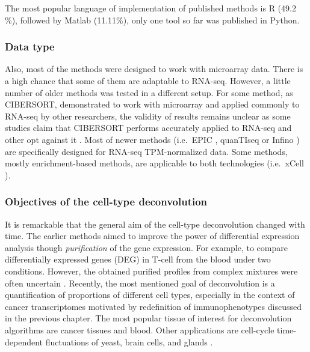\documentclass[12pt,]{book}
\theoremstyle{definition}
\theoremstyle{definition}
\theoremstyle{definition}
\theoremstyle{remark}
\begin{document}
The most popular language of implementation of published methods is R
(49.2 \%), followed by Matlab (11.11\%), only one tool so far was
published in Python.

\hypertarget{data-type}{%
\subsubsection{Data type}\label{data-type}}

Also, most of the methods were designed to work with microarray data.
There is a high chance that some of them are adaptable to RNA-seq.
However, a little number of older methods was tested in a different
setup. For some method, as CIBERSORT, demonstrated to work with
microarray and applied commonly to RNA-seq by other researchers, the
validity of results remains unclear as some studies claim that CIBERSORT
performs accurately applied to RNA-seq \citep{Thorsson2018} and other
opt against it \citep{Li2017, Tamborero2018}. Most of newer methods
(i.e.~EPIC \citep{Racle2017}, quanTIseq \citep{Finotello2017} or Infino
\citep{Zaslavsky2017}) are specifically designed for RNA-seq
TPM-normalized data. Some methods, mostly enrichment-based methods, are
applicable to both technologies (i.e.~xCell \citep{Aran2017}).

\hypertarget{objectives-of-the-cell-type-deconvolution}{%
\subsubsection{Objectives of the cell-type
deconvolution}\label{objectives-of-the-cell-type-deconvolution}}

It is remarkable that the general aim of the cell-type deconvolution
changed with time. The earlier methods aimed to improve the power of
differential expression analysis though \emph{purification} of the gene
expression. For example, to compare differentially expressed genes (DEG)
in T-cell from the blood under two conditions. However, the obtained
purified profiles from complex mixtures were often uncertain
\citep{Onuchic2016}. Recently, the most mentioned goal of deconvolution
is a quantification of proportions of different cell types, especially
in the context of cancer transcriptomes motivated by redefinition of
immunophenotypes discussed in the previous chapter. The most popular
tissue of interest for deconvolution algorithms are cancer tissues and
blood. Other applications are cell-cycle time-dependent fluctuations of
yeast, brain cells, and glands .
\end{document}
